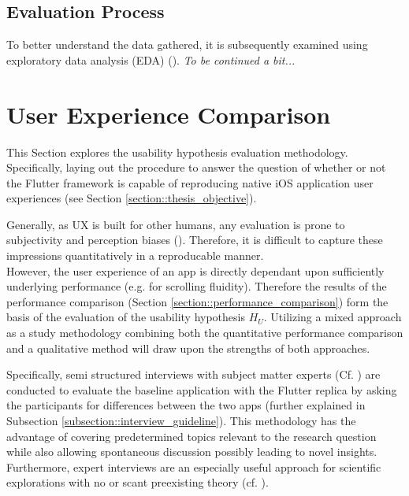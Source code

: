 \subsection{Evaluation Process} \label{subsection::evaluation_process}
To better understand the data gathered, it is subsequently examined using exploratory data
analysis (EDA) (\cite{Tukey1977}). \textit{To be continued a bit...}


\section{User Experience Comparison} \label{section::usability_comparison_design}
This Section explores the usability hypothesis evaluation methodology. Specifically, laying out
the procedure to answer the question of whether or not the Flutter framework is capable of
reproducing native iOS application user experiences (see Section \ref{section::thesis_objective}).

Generally, as UX is built for other humans, any evaluation is prone to subjectivity and perception
biases (\cite{Tversky1974}). Therefore, it is difficult to capture these impressions quantitatively in a reproducable manner.\\
However, the user experience of an app is directly dependant upon sufficiently underlying performance (e.g. for scrolling
fluidity). Therefore the results of the performance comparison (Section \ref{section::performance_comparison}) form the basis of the evaluation of the usability hypothesis $H_U$.
Utilizing a mixed approach as a study methodology combining both the quantitative performance comparison and a qualitative method will draw upon the strengths of both approaches. 

Specifically, semi structured interviews with subject matter experts (Cf. \cite{Liebold2009}) are conducted to evaluate the baseline application
with the Flutter replica by asking the participants for differences between the two apps (further explained in Subsection \ref{subsection::interview_guideline}). This methodology has the
advantage of covering predetermined topics relevant to the research question while also allowing spontaneous discussion possibly leading to novel insights.\\
Furthermore, expert interviews are an especially useful approach for scientific explorations
with no or scant preexisting theory (cf. \cite{Experts2009}).

